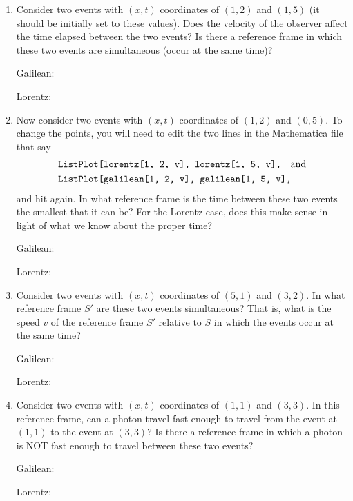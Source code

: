 \begin{enumerate}
\item Consider two events with $(x,t)$ coordinates of $(1,2)$ and $(1,5)$ (it should be initially set to these values).  Does the velocity of the observer affect the time elapsed between the two events?  Is there a reference frame in which these two events are simultaneous (occur at the same time)?  

\bigskip
\hspace{0.5in}Galilean:

\bigskip
\hspace{0.5in}Lorentz:
\answerspace{0.5in}

\item Now consider two events with $(x,t)$ coordinates of $(1,2)$ and $(0,5)$. To change the points, you will need to edit the two lines in the Mathematica file that say
\begin{align*}
&\texttt{ListPlot[{lorentz[1, 2, v], lorentz[1, 5, v]},}~~~ {\rm and} \\
&\texttt{ListPlot[{galilean[1, 2, v], galilean[1, 5, v]},}
\end{align*}
and hit  again.
In what reference frame is the time between these two events the smallest that it can be?  For the Lorentz case, does this make sense in light of what we know about the proper time?

\bigskip
\hspace{0.5in}Galilean:

\bigskip
\hspace{0.5in}Lorentz:
\answerspace{0.5in}

\item Consider two events with $(x,t)$ coordinates of $(5,1)$ and $(3,2)$. In what reference frame $S'$ are these two events simultaneous? That is, what is the speed $v$ of the reference frame $S'$ relative to $S$ in which the events occur at the same time?

\bigskip
\hspace{0.5in}Galilean:

\bigskip
\hspace{0.5in}Lorentz:
\answerspace{0.5in}

\item Consider two events with $(x,t)$ coordinates of $(1,1)$ and $(3,3)$. In this reference frame, can a photon travel fast enough to travel from the event at $(1,1)$ to the event at $(3,3)$?  Is there a reference frame in which a photon is NOT fast enough to travel between these two events?

\bigskip
\hspace{0.5in}Galilean:

\bigskip
\hspace{0.5in}Lorentz:
\answerspace{0.5in}

\end{enumerate}
